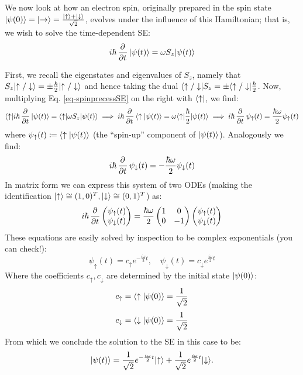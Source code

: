 We now look at how an electron spin, originally prepared in the spin state $\lvert \psi(0) \rangle = \lvert \rightarrow \rangle = \frac{\lvert \uparrow \rangle + \lvert \downarrow \rangle}{\sqrt{2}}$, evolves under the influence of this Hamiltonian; that is, we wish to solve the time-dependent SE:
\begin{equation}\label{eq-spinprecessSE}
    i\hbar\dpd{}{t}\ket{\psi(t)} = \omega S_z\ket{\psi(t)}
\end{equation}

First, we recall the eigenstates and eigenvalues of $S_z$, namely that $S_z\lvert \uparrow/\downarrow \rangle = \pm \frac{\hbar}{2}\lvert \uparrow/\downarrow \rangle$ and hence taking the dual $\langle \uparrow/\downarrow \rvert S_z = \pm \langle \uparrow/\downarrow \rvert\frac{\hbar}{2}$. Now, multiplying Eq. \eqref{eq-spinprecessSE} on the right with $\langle \uparrow \rvert$, we find:
\begin{equation}
    \bra{\uparrow}i\hbar\dpd{}{t}\ket{\psi(t)} = \bra{\uparrow}\omega S_z \ket{\psi(t)} \implies i\hbar\dpd{}{t}\braket{\uparrow}{\psi(t)} = \omega\bra{\uparrow}\frac{\hbar}{2}\ket{\psi(t)} \implies i\hbar\dpd{}{t}\psi_\uparrow(t) = \frac{\hbar\omega}{2}\psi_\uparrow(t)
\end{equation}
where $\psi_\uparrow(t) \coloneqq \langle \uparrow \lvert \psi(t) \rangle$ (the ``spin-up'' component of $\lvert \psi(t) \rangle$). Analogously we find:
\begin{equation}
    i\hbar\dpd{}{t}\psi_\downarrow(t) = -\frac{\hbar\omega}{2}\psi_\downarrow(t)
\end{equation}
In matrix form we can express this system of two ODEs (making the identification $\lvert \uparrow \rangle \cong (1, 0)^T, \lvert \downarrow \rangle \cong (0, 1)^T$) as:
\begin{equation}
    i\hbar\dpd{}{t}\m{\psi_\uparrow(t) \\ \psi_\downarrow(t)} = \frac{\hbar\omega}{2}\m{1 & 0 \\ 0 & -1}\m{\psi_\uparrow(t) \\ \psi_\downarrow(t)}
\end{equation}
These equations are easily solved by inspection to be complex exponentials (you can check!):
\begin{equation}
    \psi_\uparrow(t) = c_\uparrow e^{-\frac{i\omega}{2}t}, \quad \psi_\downarrow(t) = c_\downarrow e^{\frac{i\omega}{2} t}
\end{equation}
Where the coefficients $c_\uparrow, c_\downarrow$ are determined by the initial state $\lvert \psi(0) \rangle$:
\begin{equation}
    c_\uparrow = \langle \uparrow \lvert \psi(0) \rangle = \frac{1}{\sqrt{2}}
\end{equation}
\begin{equation}
    c_\downarrow = \langle \downarrow \lvert \psi(0) \rangle = \frac{1}{\sqrt{2}}
\end{equation}
From which we conclude the solution to the SE in this case to be:
\begin{equation}\label{eq-spinprecesssoln}
    \lvert \psi(t) \rangle = \frac{1}{\sqrt{2}}e^{-\frac{i\omega}{2}t}\lvert \uparrow \rangle + \frac{1}{\sqrt{2}}e^{\frac{i\omega}{2} t}\lvert \downarrow \rangle.
\end{equation}

